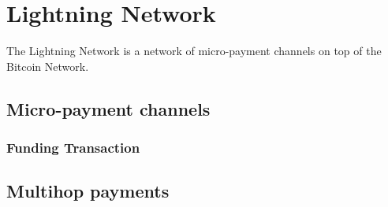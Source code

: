 \section{Lightning Network}
\label{sec:lightning:network}

The Lightning Network is a network of micro-payment channels on top of the Bitcoin Network. 

\subsection{Micro-payment channels}

\subsubsection{Funding Transaction}

\subsection{Multihop payments}


